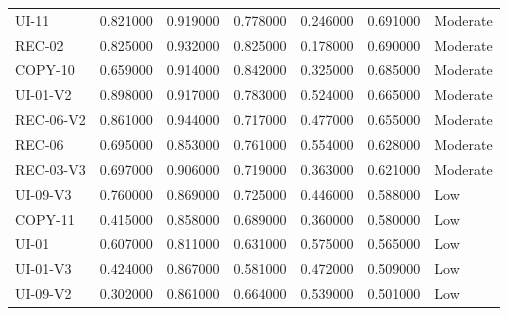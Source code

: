 \begin{tabular}{lrrrrrl}
UI-11 & 0.821000 & 0.919000 & 0.778000 & 0.246000 & 0.691000 & Moderate \\
REC-02 & 0.825000 & 0.932000 & 0.825000 & 0.178000 & 0.690000 & Moderate \\
COPY-10 & 0.659000 & 0.914000 & 0.842000 & 0.325000 & 0.685000 & Moderate \\
UI-01-V2 & 0.898000 & 0.917000 & 0.783000 & 0.524000 & 0.665000 & Moderate \\
REC-06-V2 & 0.861000 & 0.944000 & 0.717000 & 0.477000 & 0.655000 & Moderate \\
REC-06 & 0.695000 & 0.853000 & 0.761000 & 0.554000 & 0.628000 & Moderate \\
REC-03-V3 & 0.697000 & 0.906000 & 0.719000 & 0.363000 & 0.621000 & Moderate \\
UI-09-V3 & 0.760000 & 0.869000 & 0.725000 & 0.446000 & 0.588000 & Low \\
COPY-11 & 0.415000 & 0.858000 & 0.689000 & 0.360000 & 0.580000 & Low \\
UI-01 & 0.607000 & 0.811000 & 0.631000 & 0.575000 & 0.565000 & Low \\
UI-01-V3 & 0.424000 & 0.867000 & 0.581000 & 0.472000 & 0.509000 & Low \\
UI-09-V2 & 0.302000 & 0.861000 & 0.664000 & 0.539000 & 0.501000 & Low \\
\bottomrule
\end{tabular}
